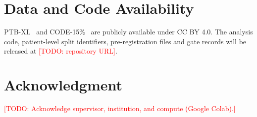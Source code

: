\documentclass[journal]{IEEEtran}
\newcommand{\todo}[1]{\textcolor{red}{[TODO: #1]}}
\begin{document}
\section*{Data and Code Availability}
PTB-XL~\cite{wagner2020ptbxl} and CODE-15\%~\cite{ribeiro2021code15} are publicly available under CC BY 4.0. The analysis code, patient-level split identifiers, pre-registration files and gate records will be released at \todo{repository URL}.

\section*{Acknowledgment}
\todo{Acknowledge supervisor, institution, and compute (Google Colab).}



\end{document}
